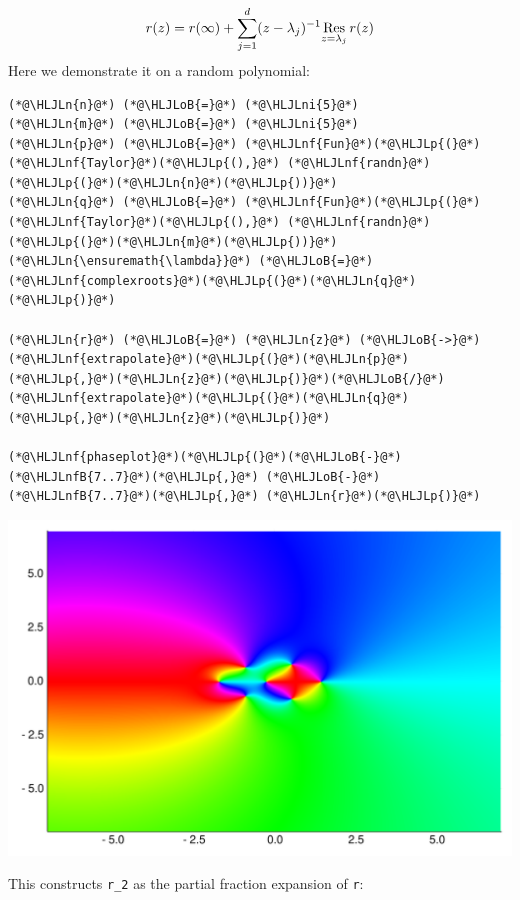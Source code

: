 \documentclass[12pt,a4paper]{article}
\newcommand{\HLJLn}[1]{#1}
\newcommand{\HLJLnf}[1]{\textcolor[RGB]{66,102,213}{#1}}
\newcommand{\HLJLnfB}[1]{\textcolor[RGB]{59,151,46}{#1}}
\newcommand{\HLJLni}[1]{\textcolor[RGB]{59,151,46}{#1}}
\newcommand{\HLJLoB}[1]{\textcolor[RGB]{102,102,102}{\textbf{#1}}}
\newcommand{\HLJLp}[1]{#1}
\begin{document}
\[
r(z) = r(\infty)  +  \sum_{j=1}^d    (z - \lambda_j)^{-1} \underset{z = \lambda_j}{\rm Res}\, r(z)
\]
Here we demonstrate it on a random polynomial:


\begin{lstlisting}
(*@\HLJLn{n}@*) (*@\HLJLoB{=}@*) (*@\HLJLni{5}@*)
(*@\HLJLn{m}@*) (*@\HLJLoB{=}@*) (*@\HLJLni{5}@*)
(*@\HLJLn{p}@*) (*@\HLJLoB{=}@*) (*@\HLJLnf{Fun}@*)(*@\HLJLp{(}@*)(*@\HLJLnf{Taylor}@*)(*@\HLJLp{(),}@*) (*@\HLJLnf{randn}@*)(*@\HLJLp{(}@*)(*@\HLJLn{n}@*)(*@\HLJLp{))}@*)
(*@\HLJLn{q}@*) (*@\HLJLoB{=}@*) (*@\HLJLnf{Fun}@*)(*@\HLJLp{(}@*)(*@\HLJLnf{Taylor}@*)(*@\HLJLp{(),}@*) (*@\HLJLnf{randn}@*)(*@\HLJLp{(}@*)(*@\HLJLn{m}@*)(*@\HLJLp{))}@*)
(*@\HLJLn{\ensuremath{\lambda}}@*) (*@\HLJLoB{=}@*) (*@\HLJLnf{complexroots}@*)(*@\HLJLp{(}@*)(*@\HLJLn{q}@*)(*@\HLJLp{)}@*)

(*@\HLJLn{r}@*) (*@\HLJLoB{=}@*) (*@\HLJLn{z}@*) (*@\HLJLoB{->}@*) (*@\HLJLnf{extrapolate}@*)(*@\HLJLp{(}@*)(*@\HLJLn{p}@*)(*@\HLJLp{,}@*)(*@\HLJLn{z}@*)(*@\HLJLp{)}@*)(*@\HLJLoB{/}@*)(*@\HLJLnf{extrapolate}@*)(*@\HLJLp{(}@*)(*@\HLJLn{q}@*)(*@\HLJLp{,}@*)(*@\HLJLn{z}@*)(*@\HLJLp{)}@*)

(*@\HLJLnf{phaseplot}@*)(*@\HLJLp{(}@*)(*@\HLJLoB{-}@*)(*@\HLJLnfB{7..7}@*)(*@\HLJLp{,}@*) (*@\HLJLoB{-}@*)(*@\HLJLnfB{7..7}@*)(*@\HLJLp{,}@*) (*@\HLJLn{r}@*)(*@\HLJLp{)}@*)
\end{lstlisting}

\includegraphics[width=\linewidth]{figures/Lecture11_5_1.pdf}

This constructs \texttt{r\_2} as the partial fraction expansion of \texttt{r}:
\end{document}
